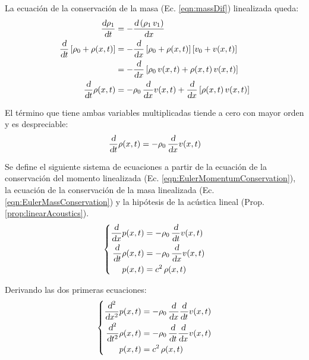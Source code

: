 \documentclass[a5paper,12pt,twoside]{book}
\begin{document}
La ecuación de la conservación de la masa (Ec. \ref{eqn:massDif}) linealizada queda:
\begin{align*}
    \frac{\textsl{d} \rho_1}{\textsl{d} t} &= - \frac{\textsl{d} \left( \rho_1 \, v_1 \right)}{\textsl{d} x}
    \\
    \frac{\textsl{d}}{\textsl{d} t} \left[ \rho_0 + \rho(x,t) \right]
    &= - \frac{\textsl{d}}{\textsl{d} x} \left[ \rho_0 + \rho(x,t) \right] \left[ v_0 + v(x,t) \right]
    \\
    &= - \frac{\textsl{d}}{\textsl{d} x} \left[ \rho_0 \, v(x,t) + \rho(x,t) \, v(x,t) \right]
    \\
    \frac{\textsl{d}}{\textsl{d} t} \rho(x,t)
    &= - \rho_0 \, \frac{\textsl{d}}{\textsl{d} x} v(x,t) + \frac{\textsl{d}}{\textsl{d} x} \left[ \rho(x,t) \, v(x,t) \right]
\end{align*}

El término que tiene ambas variables multiplicadas tiende a cero con mayor orden y es despreciable:
\begin{equation}
    \frac{\textsl{d}}{\textsl{d} t} \rho(x,t) = - \rho_0 \, \frac{\textsl{d}}{\textsl{d} x} v(x,t)
    \label{eqn:EulerMassConservation}
\end{equation}

Se define el siguiente sistema de ecuaciones a partir de la ecuación de la conservación del momento linealizada (Ec. \ref{eqn:EulerMomentumConservation}), la ecuación de la conservación de la masa linealizada (Ec. \ref{eqn:EulerMassConservation}) y la hipótesis de la acústica lineal (Prop. \ref{prop:linearAcoustics}).
\begin{equation*}
    \left\{
    \begin{aligned}
        \frac{\textsl{d}}{\textsl{d} x} p(x,t) &= - \rho_0 \, \frac{\textsl{d}}{\textsl{d} t} v(x,t)
        \\
        \frac{\textsl{d}}{\textsl{d} t} \rho(x,t) &= - \rho_0 \, \frac{\textsl{d}}{\textsl{d} x} v(x,t)
        \\
        p(x,t) &= c^2\,\rho(x,t)
    \end{aligned}
    \right.
\end{equation*}

Derivando las dos primeras ecuaciones:
\begin{equation*}
    \left\{
    \begin{aligned}
        \frac{\textsl{d}^2}{\textsl{d} x^2} p(x,t) &= - \rho_0 \, \frac{\textsl{d}}{\textsl{d} x} \frac{\textsl{d}}{\textsl{d} t} v(x,t)
        \\
        \frac{\textsl{d}^2}{\textsl{d} t^2} \rho(x,t) &= - \rho_0 \, \frac{\textsl{d}}{\textsl{d} t} \frac{\textsl{d}}{\textsl{d} x} v(x,t)
        \\
        p(x,t) &= c^2\,\rho(x,t)
    \end{aligned}
    \right.
\end{equation*}
\end{document}
